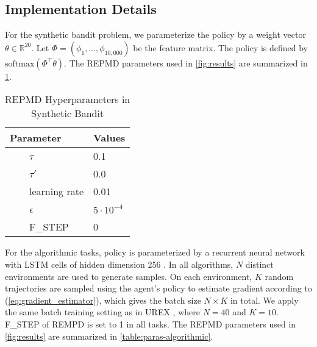 \subsection{Implementation Details}
\label{subsec:implementation}
For the synthetic bandit problem, we parameterize the policy by a weight vector $\theta\in  \mathbb{R}^{20}$. Let $\Phi = \left( \phi_1, \dots, \phi_{10,000} \right)$ be the feature matrix. The policy is defined by $\text{softmax}(\Phi^{\top}\theta)$. The REPMD parameters used in \cref{fig:results} are summarized in \cref{table:paras-bandit}. 
\begin{table}[ht]
\caption{REPMD Hyperparameters in Synthetic Bandit} %
\centering 
\begin{tabular}{l l} 
\hline
Parameter & Values \\ [0.5ex] %
\hline %
\ \ \ \ $\tau$ & 0.1  \\
\ \ \ \ $\tau'$ & 0.0 \\
\ \ \ \ learning rate & 0.01 \\
\ \ \ \ $\epsilon $ & $5\cdot 10^{-4}$ \\
\ \ \ \ F\_STEP & 0 \\
\hline
\end{tabular}
\label{table:paras-bandit} %
\end{table}


For the algorithmic tasks, policy is parameterized by a recurrent neural network with LSTM cells of hidden dimension 256 \citep{hochreiter1997long}. In all algorithms, $N$ distinct environments are used to generate samples. On each environment, $K$ random trajectories are sampled using the agent's policy to estimate gradient according to (\ref{eq:gradient_estimator}), which gives the batch size $N\times K$ in total. We apply the same batch training setting as in UREX \citep{nachum2017improving}, where $N=40$ and $K=10$. F\_STEP of REMPD is set to 1 in all tasks. The REPMD parameters used in \cref{fig:results} are summarized in \cref{table:paras-algorithmic}. 

